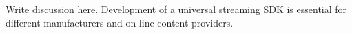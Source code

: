 
Write discussion here.
Development of a universal streaming SDK is essential for different
manufacturers and on-line content providers.
